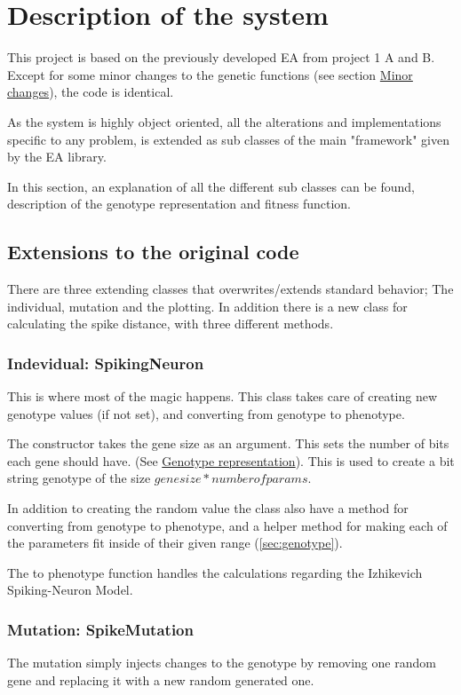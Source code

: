 \section{Description of the system}
\label{sec:descsys}

This project is based on the previously developed EA from project 1 A and B. Except for some minor changes 
to the genetic functions (see section \hyperref[sec:geneticchanges]{Minor changes}), the code is identical.

As the system is highly object oriented, all the alterations and implementations specific to any problem,
is extended as sub classes of the main "framework" given by the EA library. 

In this section, an explanation of all the different sub classes can be found, description of the genotype
representation and fitness function. 

\subsection{Extensions to the original code}
\label{sec:extensions}

There are three extending classes that overwrites/extends standard behavior; The individual,
mutation and the plotting. In addition there is a new class for calculating the spike distance, with 
three different methods.

\subsubsection{Indevidual: SpikingNeuron}

This is where most of the magic happens. This class takes care of creating new genotype values (if not set),
and converting from genotype to phenotype. 

The constructor takes the gene size as an argument. This sets the number of bits each gene should have. 
(See \hyperref[sec:genotype]{Genotype representation}). This is used to create a bit string genotype of the size 
$gene size * number of params$. 

In addition to creating the random value the class also have a method for converting from genotype
to phenotype, and a helper method for making each of the parameters fit inside of their given range 
(\autoref{sec:genotype}). 

The to phenotype function handles the calculations regarding the Izhikevich Spiking-Neuron Model. 

\subsubsection{Mutation: SpikeMutation}
The mutation simply injects changes to the genotype by removing one random gene and replacing it
with a new random generated one. 

